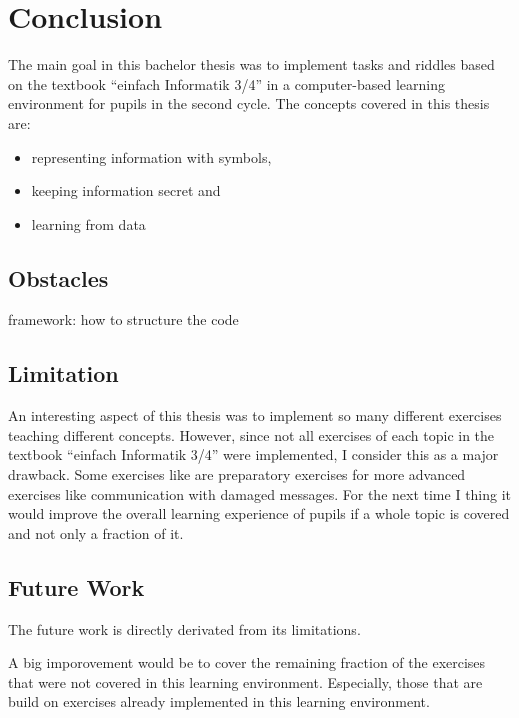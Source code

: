 \chapter{Conclusion}
\label{chapter:conclusion}

The main goal in this bachelor thesis was to implement tasks and riddles based on the textbook “einfach Informatik 3/4” in a computer-based learning environment for pupils in the second cycle. The concepts covered in this thesis are:

\begin{itemize}
    \item representing information with symbols,
    \item keeping information secret and
    \item learning from data
\end{itemize}

\section{Obstacles}

framework: how to structure the code 

\section{Limitation}

An interesting aspect of this thesis was to implement so many different exercises teaching different concepts. However, since not all exercises of each topic in the textbook “einfach Informatik 3/4” were implemented, I consider this as a major drawback. Some exercises like  are preparatory exercises for more advanced exercises like communication with damaged messages. For the next time I thing it would improve the overall learning experience of pupils if a whole topic is covered and not only a fraction of it.


\section{Future Work}

The future work is directly derivated from its limitations.

A big imporovement would be to cover the remaining fraction of the exercises that were not covered in this learning environment. Especially, those that are build on exercises already implemented in this learning environment.

